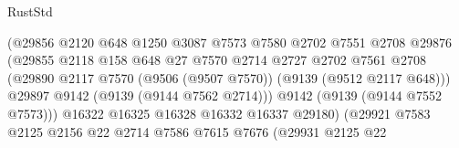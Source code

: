 \begin{lexlean}{RustStd}
\begin{coremodule}
                                          (@29856
                                            @2120
                                            @648
                                            @1250
                                            @3087
                                            @7573
                                            @7580
                                            @2702
                                            @7551
                                            @2708
                                            @29876
                                            (@29855
                                              @2118
                                              @158
                                              @648
                                              @27
                                              @7570
                                              @2714
                                              @2727
                                              @2702
                                              @7561
                                              @2708
                                              (@29890
                                                @2117
                                                @7570
                                                (@9506 (@9507 @7570))
                                                (@9139 (@9512 @2117 @648)))
                                              @29897
                                              @9142
                                              (@9139 (@9144 @7562 @2714)))
                                            @9142
                                            (@9139 (@9144 @7552 @7573)))
                                          @16322
                                          @16325
                                          @16328
                                          @16332
                                          @16337
                                          @29180)
                                        (@29921
                                          @7583
                                          @2125
                                          @2156
                                          @22
                                          @2714
                                          @7586
                                          @7615
                                          @7676
                                          (@29931
                                            @2125
                                            @22

\end{coremodule}
\end{lexlean}
